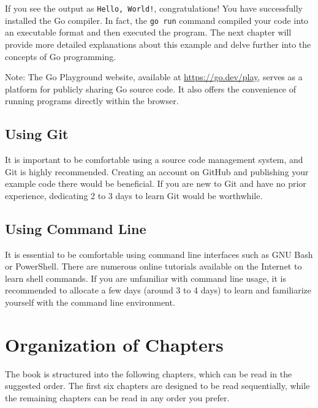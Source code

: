 If you see the output as \texttt{Hello, World!}, congratulations! You have
successfully installed the Go compiler. In fact, the \texttt{go run} command
compiled your code into an executable format and then executed the program. The
next chapter will provide more detailed explanations about this example and
delve further into the concepts of Go programming.

Note: The Go Playground website, available at \url{https://go.dev/play}, serves
as a platform for publicly sharing Go source code. It also offers the
convenience of running programs directly within the browser.

\subsection{Using Git}

It is important to be comfortable using a source code management system, and
Git is highly recommended. Creating an account on GitHub and
publishing your example code there would be beneficial. If you are new to Git
and have no prior experience, dedicating 2 to 3 days to learn Git would be
worthwhile.

\subsection{Using Command Line}

It is essential to be comfortable using command line
interfaces such as GNU Bash or PowerShell. There are numerous online tutorials
available on the Internet to learn shell commands. If you are unfamiliar with
command line usage, it is recommended to allocate a few days (around 3 to 4
days) to learn and familiarize yourself with the command line environment.

\section{Organization of Chapters}

The book is structured into the following chapters, which can be read in the
suggested order. The first six chapters are designed to be read sequentially,
while the remaining chapters can be read in any order you prefer.

